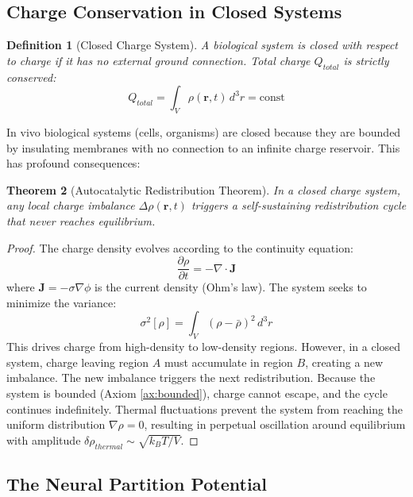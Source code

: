 \documentclass[12pt,a4paper]{article}
\newtheorem{theorem}{Theorem}[section]
\newtheorem{definition}[theorem]{Definition}
\begin{document}
\subsection{Charge Conservation in Closed Systems}

\begin{definition}[Closed Charge System]
A biological system is \textit{closed} with respect to charge if it has no external ground connection. Total charge $Q_{total}$ is strictly conserved:
\begin{equation}
Q_{total} = \int_V \rho(\mathbf{r},t) \, d^3r = \text{const}
\end{equation}
\end{definition}

In vivo biological systems (cells, organisms) are closed because they are bounded by insulating membranes with no connection to an infinite charge reservoir. This has profound consequences:

\begin{theorem}[Autocatalytic Redistribution Theorem]
\label{thm:autocatalytic}
In a closed charge system, any local charge imbalance $\Delta\rho(\mathbf{r},t)$ triggers a self-sustaining redistribution cycle that never reaches equilibrium.
\end{theorem}

\begin{proof}
The charge density evolves according to the continuity equation:
\begin{equation}
\frac{\partial \rho}{\partial t} = -\nabla \cdot \mathbf{J}
\end{equation}
where $\mathbf{J} = -\sigma \nabla \phi$ is the current density (Ohm's law). The system seeks to minimize the variance:
\begin{equation}
\sigma^2[\rho] = \int_V (\rho - \bar{\rho})^2 \, d^3r
\end{equation}
This drives charge from high-density to low-density regions. However, in a closed system, charge leaving region $A$ must accumulate in region $B$, creating a new imbalance. The new imbalance triggers the next redistribution. Because the system is bounded (Axiom \ref{ax:bounded}), charge cannot escape, and the cycle continues indefinitely. Thermal fluctuations prevent the system from reaching the uniform distribution $\nabla\rho = 0$, resulting in perpetual oscillation around equilibrium with amplitude $\delta\rho_{thermal} \sim \sqrt{k_B T / V}$.
\end{proof}

\subsection{The Neural Partition Potential}
\end{document}
